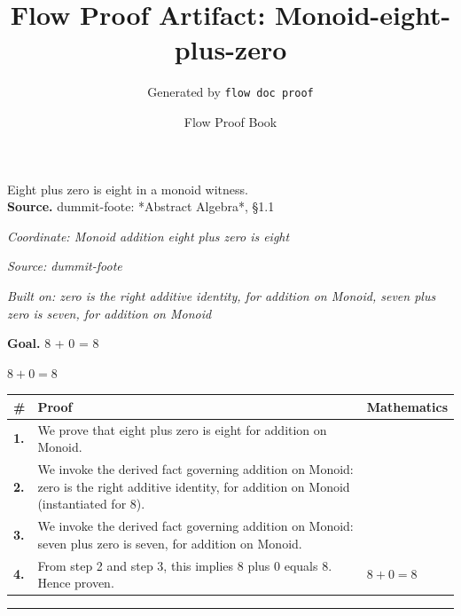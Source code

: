 \documentclass[11pt]{article}
\title{Flow Proof Artifact: Monoid-eight-plus-zero}
\author{Generated by \texttt{flow doc proof}}
\date{Flow Proof Book}
\theoremstyle{definition}
\begin{document}
\maketitle
Eight plus zero is eight in a monoid witness.\\[0.5em]
\textbf{Source.} dummit-foote: *Abstract Algebra*, §1.1\\[0.5em]
\bigskip
{}\par
\smallskip\noindent\textit{Coordinate: Monoid \cdot addition \cdot eight plus zero is eight}\par
\smallskip\noindent\textit{Source: dummit-foote}\par
\smallskip\noindent\textit{Built on: zero is the right additive identity, for addition on Monoid, seven plus zero is seven, for addition on Monoid}\par
\medskip
\noindent\textbf{Goal.} 8 + 0 = 8\par
\noindent$\displaystyle 8 + 0 = 8$\par
\medskip
\noindent
\begin{tabular}{@{} >{\raggedright\arraybackslash}p{} >{\raggedright\arraybackslash}p{} >{\raggedleft\arraybackslash}p{} @{}}
\textbf{\#} & \textbf{Proof} & \textbf{Mathematics} \\
\midrule
\textbf{1.} & We prove that eight plus zero is eight for addition on Monoid. & \\[0.45em]
\textbf{2.} & We invoke the derived fact governing addition on Monoid: zero is the right additive identity, for addition on Monoid (instantiated for 8). & \\[0.45em]
\textbf{3.} & We invoke the derived fact governing addition on Monoid: seven plus zero is seven, for addition on Monoid. & \\[0.45em]
\textbf{4.} & From step 2 and step 3, this implies 8 plus 0 equals 8. Hence proven. & $\displaystyle 8 + 0 = 8$ \\[0.45em]
\bottomrule
\end{tabular}
\label{thm:Monoid-addition-eight_plus_zero_is_eight}
\par\medskip\hrule
\end{document}
